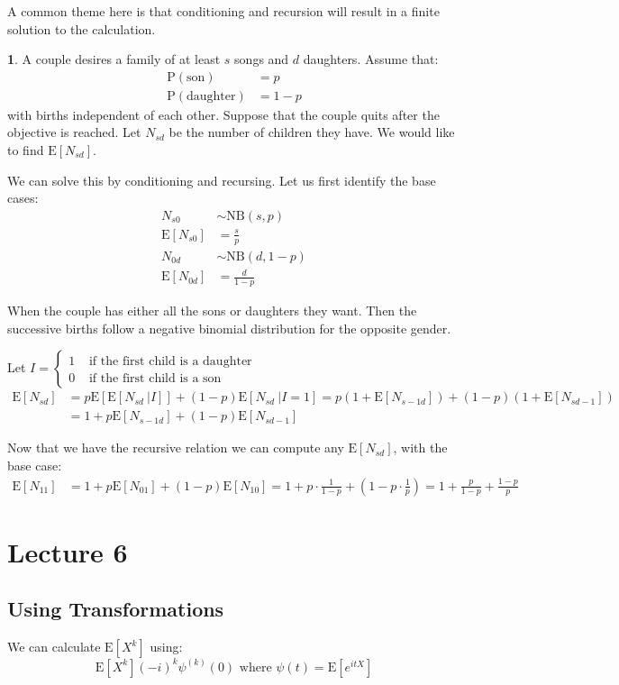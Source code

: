 \documentclass[english,12pt]{article}
\theoremstyle{plain}
\theoremstyle{definition}
\newtheorem*{example}{\protect\examplename}
\theoremstyle{definition} %
\newcommand{\eg}[1]{\begin{example} #1 \end{example} }
\providecommand{\examplename}{Example}
\newcommand{\ex}[1]{\mbox{E} \left[ #1 \right]}
\newcommand{\condex}[2]{\mbox{E} \left[ \left. #1 \ \right\vert \left. #2 \right. \right]}
\begin{document}
A common theme here is that conditioning and recursion will result in a finite solution to the calculation.

\eg{
A couple desires a family of at least $s$ songs and $d$ daughters.  Assume that:
\begin{align*}
\text{P}(\text{son})&=p\\
\text{P}(\text{daughter})&=1-p
\end{align*}
with births independent of each other.  Suppose that the couple quits after the objective is reached.  Let $N_{sd}$ be the number of children they have.  We would like to find $\ex{N_{sd}}$.

We can solve this by conditioning and recursing.  Let us first identify the base cases:
\begin{align*}
N_{s0}&\sim\text{NB}(s,p)\\
\ex{N_{s0}}&=\frac{s}{p}\\
N_{0d}&\sim\text{NB}(d,1-p)\\
\ex{N_{0d}}&=\frac{d}{1-p}
\end{align*}

When the couple has either all the sons or daughters they want.  Then the successive births follow a negative binomial distribution for the opposite gender.

Let $I=\begin{cases}
1 & \text{ if the first child is a daughter}\\
0 & \text{ if the first child is a son}
\end{cases}$
\begin{align*}
\ex{N_{sd}}&=p\ex{\condex{N_{sd}}{I}}+(1-p)\condex{N_{sd}}{I=1}
=p(1+\ex{N_{s-1d}})+(1-p)(1+\ex{N_{sd-1}})\\
&=1+p\ex{N_{s-1d}}+(1-p)\ex{N_{sd-1}}
\end{align*}

Now that we have the recursive relation we can compute any $\ex{N_{sd}}$, with the base case:
\begin{align*}
\ex{N_{11}}&=1+p\ex{N_{01}}+(1-p)\ex{N_{10}}
=1+p\cdot\frac{1}{1-p}+(1-p\cdot\frac{1}{p})
=1+\frac{p}{1-p}+\frac{1-p}{p}
\end{align*}
}

\section*{Lecture 6}
\subsection{Using Transformations}
We can calculate $\ex{X^k}$ using:
\[\ex{X^k}(-i)^k\psi^{(k)}(0)\text{ where }\psi(t)=\ex{e^{itX}}\]
\end{document}
